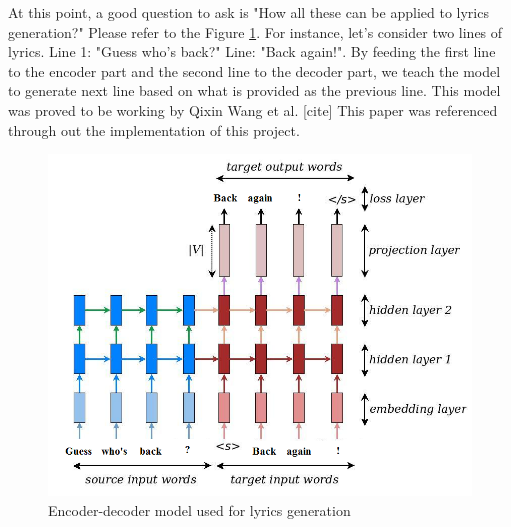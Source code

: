 \documentclass{article}
\begin{document}
At this point, a good question to ask is "How all these can be applied to lyrics generation?" Please refer to the Figure \ref{fig:encdec-for-lyr}. For instance, let's consider two lines of lyrics. Line 1: "Guess who's back?" Line: "Back again!". By feeding the first line to the encoder part and the second line to the decoder part, we teach the model to generate next line based on what is provided as the previous line. This model was proved to be working by Qixin Wang et al. [cite] This paper was referenced through out the implementation of this project.

\begin{figure}[!ht]
\centering
\includegraphics[scale=0.35]{5.png}
\caption{Encoder-decoder model used for lyrics generation}
\label{fig:encdec-for-lyr}
\end{figure}
\end{document}
